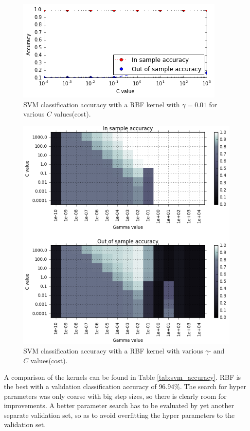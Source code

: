 \documentclass[a4paper,10pt,article,oneside,english]{memoir}
\begin{document}
\begin{figure}[h!]
	\centering
	\includegraphics[width=0.7\linewidth]{svm_rbf.PNG}
	\caption{SVM classification accuracy with a RBF kernel with $\gamma=0.01$ for various $C$ values(cost).}
	\label{fig:svm_rbf}
\end{figure}

\begin{figure}[h!]
	\centering
	\includegraphics[width=0.9\linewidth]{svm_rbf_grid.PNG}
	\caption{SVM classification accuracy with a RBF kernel with various $\gamma$- and $C$ values(cost).}
	\label{fig:svm_rbf_grid}
\end{figure}

A comparison of the kernels can be found in Table \ref{tab:svm_accuracy}. RBF is the best with a validation classification accuracy of $96.94\%$. The search for hyper parameters was only coarse with big step sizes, so there is clearly room for improvements. A better parameter search has to be evaluated by yet another separate validation set, so as to avoid overfitting the hyper parameters to the validation set. 
\end{document}
